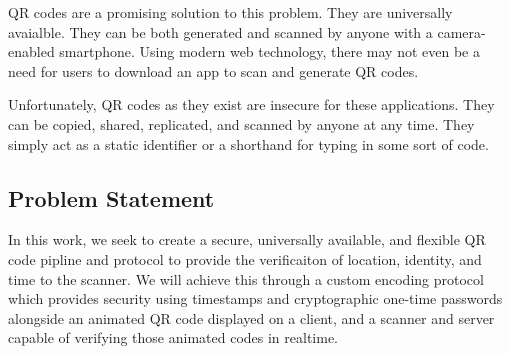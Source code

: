 \documentclass[10pt,twocolumn,letterpaper]{article}
\begin{document}
QR codes are a promising solution to this problem. They are universally avaialble. They can be both generated and scanned by anyone with a camera-enabled smartphone. Using modern web technology, there may not even be a need for users to download an app to scan and generate QR codes.

Unfortunately, QR codes as they exist are insecure for these applications. They can be copied, shared, replicated, and scanned by anyone at any time. They simply act as a static identifier or a shorthand for typing in some sort of code.

\subsection{Problem Statement}
In this work, we seek to create a secure, universally available, and flexible QR code pipline and protocol to provide the verificaiton of location, identity, and time to the scanner. We will achieve this through a custom encoding protocol which provides security using timestamps and cryptographic one-time passwords alongside an animated QR code displayed on a client, and a scanner and server capable of verifying those animated codes in realtime.
\end{document}
